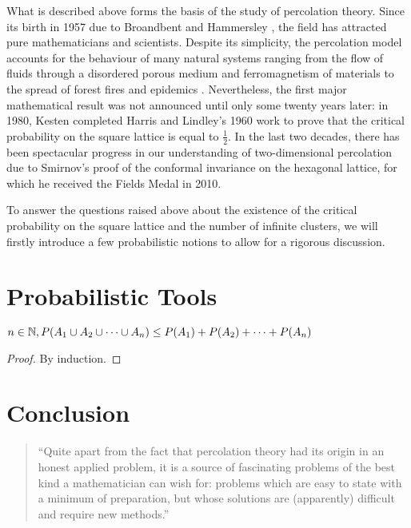 \documentclass[a4paper, 12pt]{article}
\begin{document}
What is described above forms the basis of the study of percolation theory. Since its birth in 1957 due to Broandbent and Hammersley \autocite*[693]{broadbent_hammersley_1957}, the field has attracted pure mathematicians and scientists. Despite its simplicity, the percolation model accounts for the behaviour of many natural systems ranging from the flow of fluids through a disordered porous medium and ferromagnetism of materials to the spread of forest fires and epidemics \autocite[60]{gennes_2000}. Nevertheless, the first major mathematical result was not announced until only some twenty years later: in 1980, Kesten \autocite*[41]{kesten_1980} completed Harris and Lindley's \autocite*[13]{harris_lindley_1960} 1960 work to prove that the critical probability on the square lattice is equal to $\frac{1}{2}$. In the last two decades, there has been spectacular progress in our understanding of two-dimensional percolation due to Smirnov's \autocite*[239]{smirnov_2001} proof of the conformal invariance on the hexagonal lattice, for which he received the Fields Medal in 2010.

To answer the questions raised above about the existence of the critical probability on the square lattice and the number of infinite clusters, we will firstly introduce a few probabilistic notions to allow for a rigorous discussion.

\section{Probabilistic Tools}

\begin{lem}
$n \in \mathbb{N}, P(A_1 \cup A_2 \cup \cdots \cup A_n) \leq P(A_1) + P(A_2) + \cdots + P(A_n)$
\end{lem}
\begin{proof}[Proof]
By induction.

\end{proof}


\section{Conclusion}
\begin{quotation}
``Quite apart from the fact that percolation theory had its origin in an honest applied problem, it is a source of fascinating problems of the best kind a mathematician can wish for: problems which are easy to state with a minimum of preparation, but whose solutions are (apparently) difficult and require new methods.''
\end{quotation}

\nocite{*}
\printbibliography
\end{document}
